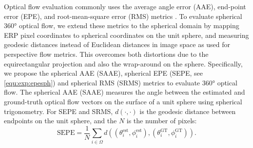 Optical flow evaluation commonly uses the average angle error (AAE), end-point error (EPE), and root-mean-square error (RMS) metrics \cite{BakerSLRBS2011}.
%
To evaluate spherical 360° optical flow, we extend these metrics to the spherical domain by mapping ERP pixel coordinates to spherical coordinates on the unit sphere, and measuring geodesic distances instead of Euclidean distances in image space as used for perspective flow metrics.
This overcomes both distortions due to the equirectangular projection and also the wrap-around on the sphere.
%
%
Specifically, we propose the spherical AAE (SAAE), spherical EPE (SEPE, see \cref{equ:exp:epesph}) and spherical RMS (SRMS) metrics to evaluate 360° optical flow.
The spherical AAE (SAAE) measures the angle between the estimated and ground-truth optical flow vectors on the surface of a unit sphere using spherical trigonometry.
%
For SEPE and SRMS, $d(\cdot, \cdot)$ is the geodesic distance between endpoints on the unit sphere, and the $N$ is the number of pixels:
%
\begin{equation}\label{equ:exp:epesph}
	\text{SEPE} = \frac{1}{N} \sum_{i \in \Omega} d\left( (\theta^\text{est}_i, \phi^\text{est}_i), (\theta^\text{GT}_i, \phi^\text{GT}_i)\right)
	\text{.}
\end{equation}


